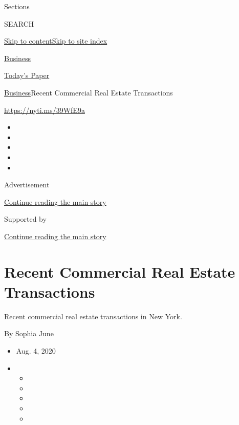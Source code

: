 Sections

SEARCH

\protect\hyperlink{site-content}{Skip to
content}\protect\hyperlink{site-index}{Skip to site index}

\href{https://www.nytimes.com/section/business}{Business}

\href{https://myaccount.nytimes.com/auth/login?response_type=cookie\&client_id=vi}{}

\href{https://www.nytimes.com/section/todayspaper}{Today's Paper}

\href{/section/business}{Business}\textbar{}Recent Commercial Real
Estate Transactions

\url{https://nyti.ms/39WfE9a}

\begin{itemize}
\item
\item
\item
\item
\item
\end{itemize}

Advertisement

\protect\hyperlink{after-top}{Continue reading the main story}

Supported by

\protect\hyperlink{after-sponsor}{Continue reading the main story}

\hypertarget{recent-commercial-real-estate-transactions}{%
\section{Recent Commercial Real Estate
Transactions}\label{recent-commercial-real-estate-transactions}}

Recent commercial real estate transactions in New York.

By Sophia June

\begin{itemize}
\item
  Aug. 4, 2020
\item
  \begin{itemize}
  \item
  \item
  \item
  \item
  \item
  \end{itemize}
\end{itemize}


